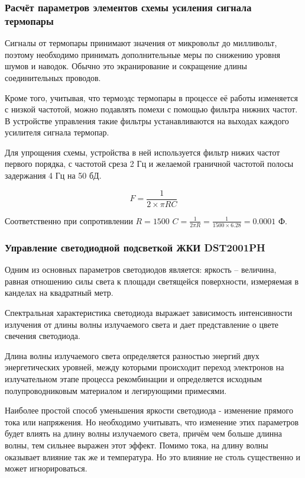 \subsubsection{Расчёт параметров элементов схемы усиления сигнала термопары}
Сигналы от термопары принимают значения от микровольт до милливольт, поэтому необходимо принимать
дополнительные меры по снижению уровня шумов и наводок.
Обычно это экранирование и сокращение длины соединительных проводов.

Кроме того, учитывая, что термоэдс термопары в процессе её работы изменяется
с низкой частотой, можно подавлять помехи с помощью
фильтра нижних частот. В устройстве управления такие фильтры устанавливаются на выходах
каждого усилителя сигнала термопар.

Для упрощения схемы, устройства в ней используется фильтр нижих частот первого порядка, с
частотой среза 2 Гц и желаемой граничной частотой полосы задержания 4 Гц на 50 бД.

\begin{equation}
	F = \frac{1} {2 \times{} \pi{} RC}
\end{equation}

Соответственно при сопротивлении  $R = 1500$
$C = \frac{1}{2\pi{}R} = \frac{1}{1500 \times{} 6.28} = 0.0001$ Ф.

\subsubsection{Управление светодиодной подсветкой ЖКИ DST2001PH}
Одним из основных параметров светодиодов является: яркость -- величина,
равная отношению силы света к площади светящейся
поверхности, измеряемая в канделах на квадратный метр.

Спектральная характеристика светодиода выражает зависимость интенсивности
излучения от длины волны излучаемого света и дает представление о цвете
свечения светодиода.


Длина волны излучаемого света определяется разностью
энергий двух энергетических уровней, между которыми происходит переход
электронов на излучательном этапе процесса рекомбинации и определяется
исходным полупроводниковым материалом и легирующими примесями.

Наиболее простой способ уменьшения яркости светодиода - изменение прямого
тока или напряжения. Но необходимо учитывать, что изменение этих параметров будет
влиять на длину волны излучаемого света, причём чем больше длинна волны, тем сильнее
выражен этот эффект. Помимо тока, на длину волны оказывает влияние так же и температура.
Но это влияние не столь существенно и может игнорироваться.


